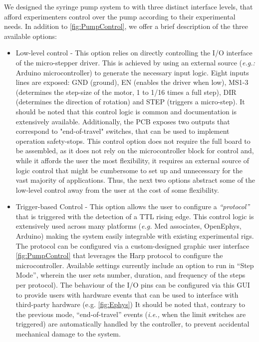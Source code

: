 We designed the syringe pump system to with three distinct interface levels, that afford experimenters control over the pump according to their experimental needs. In addition to \ref*{fig:PumpControl}, we offer a brief description of the three available options:
\begin{itemize}

\item{Low-level control} - This option relies on directly controlling the I/O interface of the micro-stepper driver. This is achieved by using an external source (\textit{e.g.:} Arduino microcontroller) to generate the necessary input logic. Eight inputs lines are exposed: GND (ground), EN (enables the driver when low), MS1-3 (determines the step-size of the motor, 1 to 1/16 times a full step), DIR (determines the direction of rotation) and STEP (triggers a micro-step). It should be noted that this control logic is common and documentation is extensively available.
Additionally, the PCB exposes two outputs that correspond to "end-of-travel" switches, that can be used to implement operation safety-stops.
This control option does not require the full board to be assembled, as it does not rely on the microcontroller block for control and, while it affords the user the most flexibility, it requires an external source of logic control that might be cumbersome to set up and unnecessary for the vast majority of applications. Thus, the next two options abstract some of the low-level control away from the user at the cost of some flexibility.

\item{Trigger-based Control} - This option allows the user to configure a \textit{“protocol”} that is triggered with the detection of a TTL rising edge. This control logic is extensively used across many platforms (\textit{e.g.} Med associates, OpenEphys, Arduino) making the system easily integrable with existing experimental rigs.
The protocol can be configured via a custom-designed graphic user interface \ref{fig:PumpControl} that leverages the Harp protocol to configure the microcontroller. Available settings currently include an option to run in “Step Mode”, wherein the user sets number, duration, and frequency of the steps per protocol). The behaviour of the I/O pins can be configured via this GUI to provide users with hardware events that can be used to interface with third-party hardware (e.g. \ref{fig:Ephys})
It should be noted that, contrary to the previous mode, “end-of-travel” events (\textit{i.e.,} when the limit switches are triggered) are automatically handled by the controller, to prevent accidental mechanical damage to the system.


\end{itemize}
